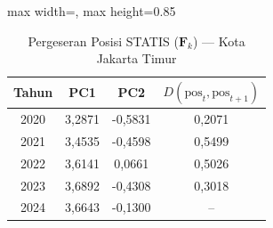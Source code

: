\begin{table}[H]
\centering
\caption{Pergeseran Posisi STATIS ($\mathbf{F}_k$) --- Kota Jakarta Timur} \label{tab:app1jarak_statis_skor_kota_jakarta_timur}
\begin{adjustbox}{max width=\textwidth, max height=0.85\textheight}
\begin{tabular}{|c|c|c|c|}
\hline
\textbf{Tahun} & \textbf{PC1} & \textbf{PC2} & \textbf{$D(\text{pos}_t, \text{pos}_{t+1})$} \\
\hline
2020 & 3,2871 & -0,5831 & 0,2071 \\
2021 & 3,4535 & -0,4598 & 0,5499 \\
2022 & 3,6141 & 0,0661 & 0,5026 \\
2023 & 3,6892 & -0,4308 & 0,3018 \\
2024 & 3,6643 & -0,1300 & -- \\
\hline
\end{tabular}
\end{adjustbox}
\end{table}